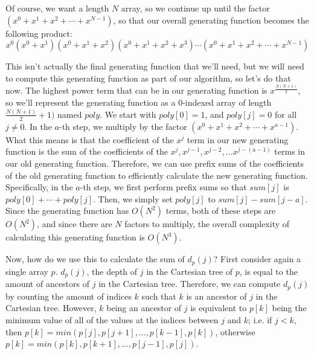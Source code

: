 \documentclass{article}
\begin{document}
Of course, we want a length $N$ array, so we continue up until the factor $(x^0 + x^1 + x^2 + \cdots + x^{N - 1})$, so that our overall generating function becomes the following product:
$$x^0(x^0 + x^1)(x^0 + x^1 + x^2)(x^0 + x^1 + x^2 + x^3)\cdots(x^0 + x^1 + x^2 + \cdots + x^{N - 1})$$

This isn’t actually the final generating function that we’ll need, but we will need to compute this generating function as part of our algorithm, so let’s do that now.
The highest power term that can be in our generating function is $x^{\frac {N(N + 1)} 2}$, so we’ll represent the generating function as a $0$-indexed array of length $\frac {N(N + 1)} 2 + 1)$ named $poly$. We start with $poly[0] = 1$, and $poly[j] = 0$ for all $j \neq 0$. In the $a$-th step, we multiply by the factor $(x^0 + x^1 + x^2 + \cdots + x^{a - 1})$. What this means is that the coefficient of the $x^j$ term in our new generating function is the sum of the coefficients of the $x^j, x^{j - 1}, x^{j - 2}, \dots x^{j - (a - 1)}$ terms in our old generating function. Therefore, we can use prefix sums of the coefficients of the old generating function to efficiently calculate the new generating function. Specifically, in the $a$-th step, we first perform prefix sums so that $sum[j]$ is $poly[0] + \cdots + poly[j]$. Then, we simply set $poly[j]$ to $sum[j] - sum[j - a]$. Since the generating function has $O(N^2)$ terms, both of these steps are $O(N^2)$, and since there are $N$ factors to multiply, the overall complexity of calculating this generating function is $O(N^3)$.

Now, how do we use this to calculate the sum of $d_p(j)$? First consider again a single array $p$. $d_p(j)$, the depth of $j$ in the Cartesian tree of $p$, is equal to the amount of ancestors of $j$ in the Cartesian tree. Therefore, we can compute $d_p(j)$ by counting the amount of indices $k$ such that $k$ is an ancestor of $j$ in the Cartesian tree. However, $k$ being an ancestor of $j$ is equivalent to $p[k]$ being the minimum value of all of the values at the indices between $j$ and $k$; i.e. if $j < k$, then $p[k] = min(p[j], p[j + 1], \dots , p[k - 1], p[k])$, otherwise $p[k] = min(p[k], p[k + 1], \dots , p[j - 1], p[j])$.
\end{document}
